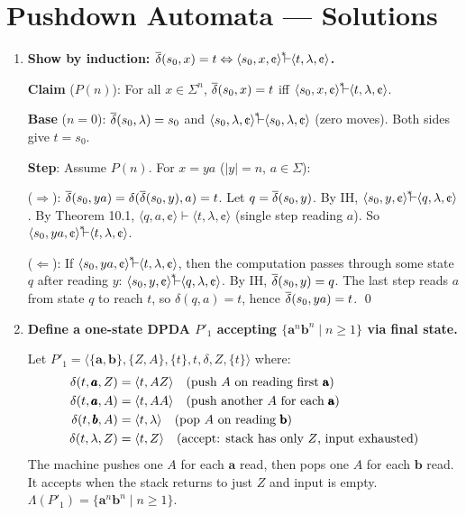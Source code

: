 
\chapter{Pushdown Automata --- Solutions}

\begin{enumerate}[{10.}1. ]

\item \textbf{Show by induction: $\DBAR(s_0,x)=t \Leftrightarrow \langle s_0,x,\cent\rangle\Dvdash\langle t,\lambda,\cent\rangle$.}

\textbf{Claim} ($P(n)$): For all $x \in \Sigma^n$, $\overline{\delta}(s_0,x)=t$ iff $\langle s_0,x,\cent\rangle\Dvdash\langle t,\lambda,\cent\rangle$.

\textbf{Base} ($n=0$): $\overline{\delta}(s_0,\lambda)=s_0$ and $\langle s_0,\lambda,\cent\rangle\Dvdash\langle s_0,\lambda,\cent\rangle$ (zero moves). Both sides give $t=s_0$. \checkmark

\textbf{Step}: Assume $P(n)$. For $x=ya$ ($|y|=n$, $a\in\Sigma$):

($\Rightarrow$): $\overline{\delta}(s_0,ya)=\delta(\overline{\delta}(s_0,y),a)=t$. Let $q=\overline{\delta}(s_0,y)$. By IH, $\langle s_0,y,\cent\rangle\Dvdash\langle q,\lambda,\cent\rangle$. By Theorem 10.1, $\langle q,a,\cent\rangle\vdash\langle t,\lambda,\cent\rangle$ (single step reading $a$). So $\langle s_0,ya,\cent\rangle\Dvdash\langle t,\lambda,\cent\rangle$.

($\Leftarrow$): If $\langle s_0,ya,\cent\rangle\Dvdash\langle t,\lambda,\cent\rangle$, then the computation passes through some state $q$ after reading $y$: $\langle s_0,y,\cent\rangle\Dvdash\langle q,\lambda,\cent\rangle$. By IH, $\overline{\delta}(s_0,y)=q$. The last step reads $a$ from state $q$ to reach $t$, so $\delta(q,a)=t$, hence $\overline{\delta}(s_0,ya)=t$. \qed

\item \textbf{Define a one-state DPDA $P'_1$ accepting $\{\pmb{a}^n\pmb{b}^n \mid n\geq 1\}$ via final state.}

Let $P'_1 = \langle\{\pmb{a},\pmb{b}\},\{Z,A\},\{t\},t,\delta,Z,\{t\}\rangle$ where:
\begin{align*}
\delta(t,\pmb{a},Z) &= \langle t, AZ\rangle \quad\text{(push $A$ on reading first \pmb{a})} \\
\delta(t,\pmb{a},A) &= \langle t, AA\rangle \quad\text{(push another $A$ for each \pmb{a})} \\
\delta(t,\pmb{b},A) &= \langle t, \lambda\rangle \quad\text{(pop $A$ on reading \pmb{b})} \\
\delta(t,\lambda,Z) &= \langle t, Z\rangle \quad\text{(accept: stack has only $Z$, input exhausted)}
\end{align*}
The machine pushes one $A$ for each $\pmb{a}$ read, then pops one $A$ for each $\pmb{b}$ read. It accepts when the stack returns to just $Z$ and input is empty. $\Lambda(P'_1) = \{\pmb{a}^n\pmb{b}^n \mid n\geq 1\}$.


\end{enumerate}
